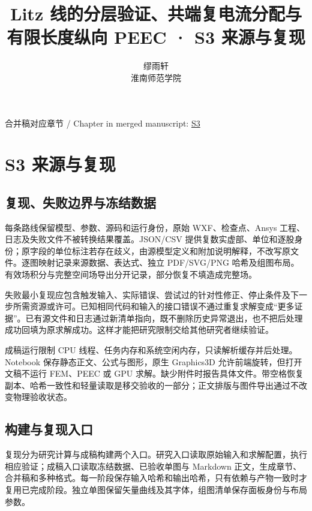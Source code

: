 \documentclass[11pt]{article}
\begin{document}
\title{Litz 线的分层验证、共端复电流分配与有限长度纵向 PEEC · S3 来源与复现}
\author{缪雨轩\\淮南师范学院}
\date{}
\maketitle
\noindent 合并稿对应章节 / Chapter in merged manuscript: \href{paper_zh-CN_single.pdf#chapter-S3}{S3}\par
\FloatBarrier
\section*{S3 来源与复现}
\hypertarget{chapter-S3}{}
\subsection*{复现、失败边界与冻结数据}
\hypertarget{S3.report_repro.heading}{}
每条路线保留模型、参数、源码和运行身份，原始 WXF、检查点、Ansys 工程、日志及失败文件不被转换结果覆盖。JSON/CSV 提供复数实虚部、单位和逐股身份；原字段的单位标注若存在歧义，由源模型定义和附加说明解释，不改写原文件。逐图映射记录来源数据、表达式、独立 PDF/SVG/PNG 哈希及组图布局。有效场积分与完整空间场导出分开记录，部分恢复不填造成完整场。


失败最小复现应包含触发输入、实际错误、尝试过的针对性修正、停止条件及下一步所需资源或许可。已知相同代码和输入的接口错误不通过重复求解变成“更多证据”。已有源文件和日志通过新清单指向，既不删除历史异常退出，也不把后处理成功回填为原求解成功。这样才能把研究限制交给其他研究者继续验证。


成稿运行限制 CPU 线程、任务内存和系统空闲内存，只读解析缓存并后处理。Notebook 保存静态正文、公式与图形，原生 Graphics3D 允许前端旋转，但打开文稿不运行 FEM、PEEC 或 GPU 求解。缺少附件时报告具体文件。带空格恢复副本、哈希一致性和轻量读取是移交验收的一部分；正文排版与图件导出通过不改变物理验收状态。


\subsection*{构建与复现入口}
\hypertarget{S3.workflow.heading}{}
复现分为研究计算与成稿构建两个入口。研究入口读取原始输入和求解配置，执行相应验证；成稿入口读取冻结数据、已验收单图与 Markdown 正文，生成章节、合并稿和多种格式。每一阶段保存输入哈希和输出哈希，只有依赖与产物一致时才复用已完成阶段。独立单图保留矢量曲线及其字体，组图清单保存面板身份与布局参数。
\end{document}
